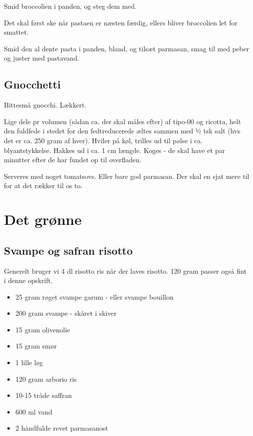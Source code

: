 \documentclass[
]{book}
\providecommand{\tightlist}{%
  \setlength{\itemsep}{0pt}\setlength{\parskip}{0pt}}
\begin{document}
Smid broccolien i panden, og steg dem med.

Det skal først ske når pastaen er næsten færdig, ellers bliver broccolien let for smattet.

Smid den al dente pasta i panden, bland, og tilsæt parmasan, smag til med peber og juster med pastavand.

\hypertarget{gnocchetti}{%
\section{Gnocchetti}\label{gnocchetti}}

Bittesmå gnocchi. Lækkert.

Lige dele pr volumen (sådan ca. der skal måles efter) af tipo-00 og ricotta,
helt den fuldfede i stedet for den fedtreducerede æltes sammen med ½ tsk salt
(hvs det er ca. 250 gram af hver).
Hviler på køl, trilles ud til pølse i ca. blyantstykkelse.
Hakkes ud i ca. 1 cm længde.
Koges - de skal have et par minutter efter de har fundet op til overfladen.

Serveres med noget tomatsovs. Eller bare god parmasan. Der skal en sjat mere
til for at det rækker til os to.

\hypertarget{det-gruxf8nne}{%
\chapter{Det grønne}\label{det-gruxf8nne}}

\hypertarget{svampe-og-safran-risotto}{%
\section{Svampe og safran risotto}\label{svampe-og-safran-risotto}}

Generelt bruger vi 4 dl risotto ris når der laves risotto.
120 gram passer også fint i denne opskrift.

\begin{itemize}
\tightlist
\item
  25 gram røget svampe garum - eller svampe bouillon
\item
  200 gram svampe - skåret i skiver
\item
  15 gram olivenolie
\item
  15 gram smør
\item
  1 lille løg
\item
  120 gram arborio ris
\item
  10-15 tråde saffran
\item
  600 ml vand
\item
  2 håndfulde revet parmasanost
\end{itemize}
\end{document}
